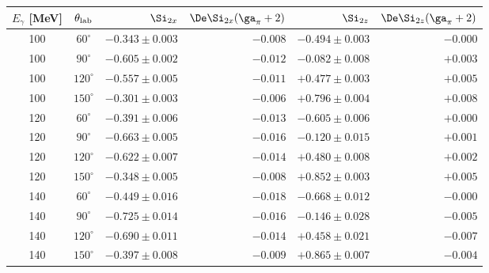 \begin{tabular}{ccrrrr}
\hline
$E_\gamma$ [MeV] & $\theta_{\rm lab}$ & $\Si_{2x}$ & $\De\Si_{2x}(\ga_\pi+2)$ & $\Si_{2z}$ & $\De\Si_{2z}(\ga_\pi+2)$ \\
\hline
100 & $60^\circ$ & $-0.343 \pm 0.003$ & $-0.008$ & $-0.494 \pm 0.003$ & $-0.000$ \\
100 & $90^\circ$ & $-0.605 \pm 0.002$ & $-0.012$ & $-0.082 \pm 0.008$ & $+0.003$ \\
100 & $120^\circ$ & $-0.557 \pm 0.005$ & $-0.011$ & $+0.477 \pm 0.003$ & $+0.005$ \\
100 & $150^\circ$ & $-0.301 \pm 0.003$ & $-0.006$ & $+0.796 \pm 0.004$ & $+0.008$ \\
120 & $60^\circ$ & $-0.391 \pm 0.006$ & $-0.013$ & $-0.605 \pm 0.006$ & $+0.000$ \\
120 & $90^\circ$ & $-0.663 \pm 0.005$ & $-0.016$ & $-0.120 \pm 0.015$ & $+0.001$ \\
120 & $120^\circ$ & $-0.622 \pm 0.007$ & $-0.014$ & $+0.480 \pm 0.008$ & $+0.002$ \\
120 & $150^\circ$ & $-0.348 \pm 0.005$ & $-0.008$ & $+0.852 \pm 0.003$ & $+0.005$ \\
140 & $60^\circ$ & $-0.449 \pm 0.016$ & $-0.018$ & $-0.668 \pm 0.012$ & $-0.000$ \\
140 & $90^\circ$ & $-0.725 \pm 0.014$ & $-0.016$ & $-0.146 \pm 0.028$ & $-0.005$ \\
140 & $120^\circ$ & $-0.690 \pm 0.011$ & $-0.014$ & $+0.458 \pm 0.021$ & $-0.007$ \\
140 & $150^\circ$ & $-0.397 \pm 0.008$ & $-0.009$ & $+0.865 \pm 0.007$ & $-0.004$ \\
\hline
\end{tabular}
